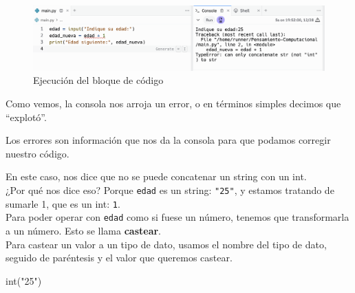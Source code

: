 \documentclass[
  letterpaper,
  DIV=11,
  numbers=noendperiod]{scrreprt}
\newenvironment{Shaded}{\begin{snugshade}}{\end{snugshade}}
\newcommand{\BuiltInTok}[1]{\textcolor[rgb]{0.00,0.23,0.31}{#1}}
\newcommand{\NormalTok}[1]{\textcolor[rgb]{0.00,0.23,0.31}{#1}}
\newcommand{\StringTok}[1]{\textcolor[rgb]{0.13,0.47,0.30}{#1}}
\begin{document}
\begin{figure}

{\centering \includegraphics{./imgs/unidad_2/error_input1.png}

}

\caption{Ejecución del bloque de código}

\end{figure}

Como vemos, la consola nos arroja un error, o en términos simples
decimos que ``explotó''.

\begin{tcolorbox}[enhanced jigsaw, colframe=quarto-callout-tip-color-frame, opacityback=0, opacitybacktitle=0.6, bottomrule=.15mm, toprule=.15mm, coltitle=black, breakable, colback=white, leftrule=.75mm, titlerule=0mm, bottomtitle=1mm, toptitle=1mm, rightrule=.15mm, title=\textcolor{quarto-callout-tip-color}{\faLightbulb}\hspace{0.5em}{¿Qué es un error?}, arc=.35mm, left=2mm, colbacktitle=quarto-callout-tip-color!10!white]

Los errores son información que nos da la consola para que podamos
corregir nuestro código.

\end{tcolorbox}

En este caso, nos dice que no se puede concatenar un string con un
int.\\
¿Por qué nos dice eso? Porque \texttt{edad} es un string: \texttt{"25"},
y estamos tratando de sumarle 1, que es un int: \texttt{1}.\\

Para poder operar con \texttt{edad} como si fuese un número, tenemos que
transformarla a un número. Esto se llama \textbf{castear}.\\

Para castear un valor a un tipo de dato, usamos el nombre del tipo de
dato, seguido de paréntesis y el valor que queremos castear.

\begin{Shaded}
\begin{Highlighting}[]
\BuiltInTok{int}\NormalTok{(}\StringTok{"25"}\NormalTok{)}
\end{Highlighting}
\end{Shaded}
\end{document}
